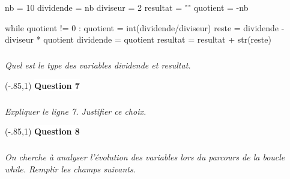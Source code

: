 \documentclass[10pt]{article}
\newif\ifprof
\begin{document}
\begin{py}
\begin{minipage}[c]{.5\linewidth}
\begin{python}
nb = 10
dividende = nb
diviseur = 2
resultat = ""
quotient = -nb
    
while quotient != 0 :
    quotient = int(dividende/diviseur)
    reste = dividende - diviseur * quotient
    dividende = quotient
    resultat = resultat + str(reste)
\end{python}
\end{minipage}
\end{py}

\subparagraph{}\textit{Quel est le type des variables \textsf{dividende} et \textsf{resultat}.}

\vspace{.3cm}
\noindent\boxput*(-.85,1){
\colorbox{white}{\textbf{Question 7}}}{
\setlength{\fboxsep}{10pt}
\fbox{\begin{minipage}{.95\linewidth}
\ifprof
\begin{corrige}
\end{corrige}
\else
\usebox{\codebox}
\vspace{3cm}
\fi
\end{minipage}}}



\subparagraph{}\textit{Expliquer le ligne 7. Justifier ce choix.}

\vspace{.3cm}
\noindent\boxput*(-.85,1){
\colorbox{white}{\textbf{Question 8}}}{
\setlength{\fboxsep}{10pt}
\fbox{\begin{minipage}{.95\linewidth}
\ifprof
\begin{corrige}
\end{corrige}
\else
\usebox{\codebox}
\vspace{3cm}
\fi
\end{minipage}}}

\newpage

\subparagraph{}\textit{On cherche à analyser l'évolution des variables lors du parcours de la boucle \textsf{while}. Remplir les champs suivants.}
\end{document}
